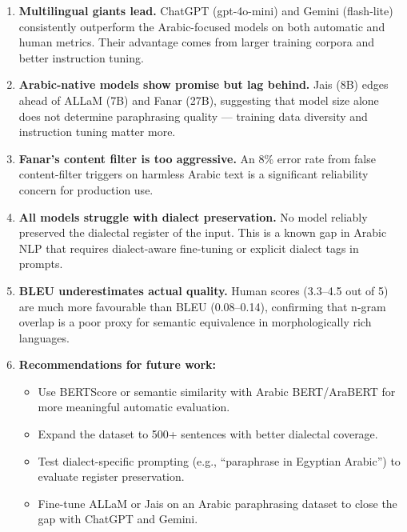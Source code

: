 \documentclass[12pt, a4paper]{article}
\begin{document}
\begin{enumerate}
    \item \textbf{Multilingual giants lead.}
          ChatGPT (gpt-4o-mini) and Gemini (flash-lite) consistently outperform
          the Arabic-focused models on both automatic and human metrics.
          Their advantage comes from larger training corpora and better
          instruction tuning.

    \item \textbf{Arabic-native models show promise but lag behind.}
          Jais (8B) edges ahead of ALLaM (7B) and Fanar (27B), suggesting that
          model size alone does not determine paraphrasing quality --- training
          data diversity and instruction tuning matter more.

    \item \textbf{Fanar's content filter is too aggressive.}
          An 8\% error rate from false content-filter triggers on harmless
          Arabic text is a significant reliability concern for production use.

    \item \textbf{All models struggle with dialect preservation.}
          No model reliably preserved the dialectal register of the input.
          This is a known gap in Arabic NLP that requires dialect-aware
          fine-tuning or explicit dialect tags in prompts.

    \item \textbf{BLEU underestimates actual quality.}
          Human scores (3.3--4.5 out of 5) are much more favourable than
          BLEU (0.08--0.14), confirming that n-gram overlap is a poor proxy
          for semantic equivalence in morphologically rich languages.

    \item \textbf{Recommendations for future work:}
    \begin{itemize}
        \item Use BERTScore or semantic similarity with Arabic BERT/AraBERT
              for more meaningful automatic evaluation.
        \item Expand the dataset to 500+ sentences with better dialectal coverage.
        \item Test dialect-specific prompting (e.g., ``paraphrase in Egyptian
              Arabic'') to evaluate register preservation.
        \item Fine-tune ALLaM or Jais on an Arabic paraphrasing dataset to
              close the gap with ChatGPT and Gemini.
    \end{itemize}
\end{enumerate}
\end{document}
